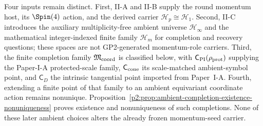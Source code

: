 \documentclass[12pt,a4paper]{article}
\begin{document}
\begin{remark}
\label{p2c:rem:dependency-record}
Four inputs remain distinct.  First, II-A and II-B supply the round momentum
host, its \(\Spin(4)\) action, and the derived carrier
\(\mathcal H_p\cong\mathcal H_1\).  Second, II-C introduces the auxiliary
multiplicity-free ambient universe
\(\mathcal H_\infty\) and the mathematical integer-indexed finite family
\(\mathcal H_m\) for completion and recovery questions; these spaces are not
GP2-generated momentum-role carriers.  Third, the finite completion
family \(\mathfrak M_{\rm coord}\) is classified below, with
\(\mathsf C_{\rm PI}(\rho_{\rm prot})\) supplying the Paper-I-A protected-scale
family, \(\mathsf C_{\rm cone}\) its scale-matched ambient-symbol point, and
\(\mathsf C_D\) the intrinsic tangential point imported from Paper~I-A.  Fourth,
extending a finite point of that family to an ambient
equivariant coordinate action remains nonunique.
Proposition~\ref{p2:prop:ambient-completion-existence-nonuniqueness}
proves existence and nonuniqueness of such completions.  None of these later
ambient choices alters the already frozen momentum-seed carrier.
\end{remark}
\end{document}
